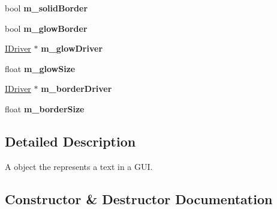 \begin{DoxyCompactItemize}
\item 
\mbox{\label{class_flounder_1_1_text_a2159869f159dcdefd7d0f06e3f2b9a90}} 
bool {\bfseries m\+\_\+solid\+Border}
\item 
\mbox{\label{class_flounder_1_1_text_a3ce6e9211ab45c2b47ba8f79814a5b40}} 
bool {\bfseries m\+\_\+glow\+Border}
\item 
\mbox{\label{class_flounder_1_1_text_a3aa6080941210c43ff5328e19e0046b4}} 
\hyperlink{class_flounder_1_1_i_driver}{I\+Driver} $\ast$ {\bfseries m\+\_\+glow\+Driver}
\item 
\mbox{\label{class_flounder_1_1_text_a50e31f71a722fb7bb08f60df82f6e625}} 
float {\bfseries m\+\_\+glow\+Size}
\item 
\mbox{\label{class_flounder_1_1_text_a3197214cf8df866bfc2312213bddc196}} 
\hyperlink{class_flounder_1_1_i_driver}{I\+Driver} $\ast$ {\bfseries m\+\_\+border\+Driver}
\item 
\mbox{\label{class_flounder_1_1_text_a32fa8331ca1221592ab27445d35ed062}} 
float {\bfseries m\+\_\+border\+Size}
\end{DoxyCompactItemize}


\subsection{Detailed Description}
A object the represents a text in a G\+UI. 



\subsection{Constructor \& Destructor Documentation}
\mbox{\label{class_flounder_1_1_text_a4b3ea3bb7486f9add5958ddcfe77c1d2}} 
